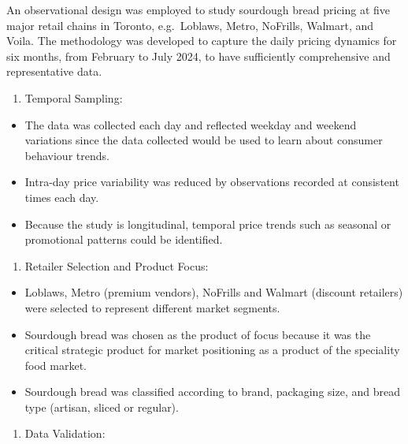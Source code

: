 \documentclass[
  letterpaper,
  DIV=11,
  numbers=noendperiod]{scrartcl}
\providecommand{\tightlist}{%
  \setlength{\itemsep}{0pt}\setlength{\parskip}{0pt}}\usepackage{longtable,booktabs,array}
\begin{document}
An observational design was employed to study sourdough bread pricing at
five major retail chains in Toronto, e.g.~Loblaws, Metro, NoFrills,
Walmart, and Voila. The methodology was developed to capture the daily
pricing dynamics for six months, from February to July 2024, to have
sufficiently comprehensive and representative data.

\begin{enumerate}
\def\labelenumi{\arabic{enumi}.}
\tightlist
\item
  Temporal Sampling:
\end{enumerate}

\begin{itemize}
\item
  The data was collected each day and reflected weekday and weekend
  variations since the data collected would be used to learn about
  consumer behaviour trends.
\item
  Intra-day price variability was reduced by observations recorded at
  consistent times each day.
\item
  Because the study is longitudinal, temporal price trends such as
  seasonal or promotional patterns could be identified.
\end{itemize}

\begin{enumerate}
\def\labelenumi{\arabic{enumi}.}
\setcounter{enumi}{1}
\tightlist
\item
  Retailer Selection and Product Focus:
\end{enumerate}

\begin{itemize}
\item
  Loblaws, Metro (premium vendors), NoFrills and Walmart (discount
  retailers) were selected to represent different market segments.
\item
  Sourdough bread was chosen as the product of focus because it was the
  critical strategic product for market positioning as a product of the
  speciality food market.
\item
  Sourdough bread was classified according to brand, packaging size, and
  bread type (artisan, sliced or regular).
\end{itemize}

\begin{enumerate}
\def\labelenumi{\arabic{enumi}.}
\setcounter{enumi}{2}
\tightlist
\item
  Data Validation:
\end{enumerate}
\end{document}

